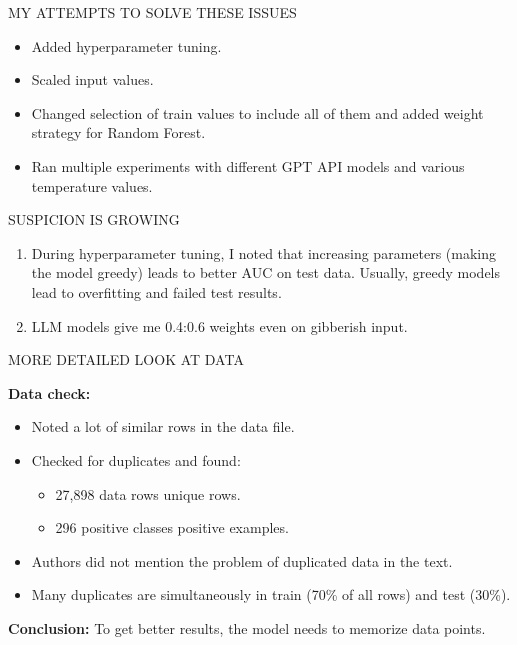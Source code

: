\documentclass[11pt, aspectratio=169]{beamer}
\begin{document}
\begin{frame}{\MakeUppercase{My attempts to solve these issues}}

    \begin{itemize}
        \item Added hyperparameter tuning.
        \item Scaled input values.
        \item Changed selection of train values to include all of them and added weight strategy for Random Forest.
        \item Ran multiple experiments with different GPT API models and various temperature values.
    \end{itemize}

\end{frame}

\begin{frame}{\MakeUppercase{Suspicion is growing}}

    \begin{enumerate}
        \item During hyperparameter tuning, I noted that increasing parameters (making the model greedy) leads to better AUC on test data. Usually, greedy models lead to overfitting and failed test results.
        \item LLM models give me 0.4:0.6 weights even on gibberish input.
    \end{enumerate}

\end{frame}


\begin{frame}{\MakeUppercase{More detailed look at data}}

    \textbf{Data check:}
    \begin{itemize}
        \item Noted a lot of similar rows in the data file.
        \item Checked for duplicates and found:
        \begin{itemize}
            \item 27,898 data rows  unique rows.
            \item 296 positive classes  positive examples.
        \end{itemize}
        \item Authors did not mention the problem of duplicated data in the text.
        \item Many duplicates are simultaneously in train (70\% of all rows) and test (30\%).
    \end{itemize}

    \textbf{Conclusion:} To get better results, the model needs to memorize data points.

\end{frame}
\end{document}
